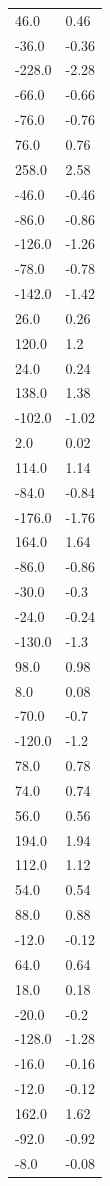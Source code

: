 \begin{longtable}{ll}
46.0 & 0.46 \\
-36.0 & -0.36 \\
-228.0 & -2.28 \\
-66.0 & -0.66 \\
-76.0 & -0.76 \\
76.0 & 0.76 \\
258.0 & 2.58 \\
-46.0 & -0.46 \\
-86.0 & -0.86 \\
-126.0 & -1.26 \\
-78.0 & -0.78 \\
-142.0 & -1.42 \\
26.0 & 0.26 \\
120.0 & 1.2 \\
24.0 & 0.24 \\
138.0 & 1.38 \\
-102.0 & -1.02 \\
2.0 & 0.02 \\
114.0 & 1.14 \\
-84.0 & -0.84 \\
-176.0 & -1.76 \\
164.0 & 1.64 \\
-86.0 & -0.86 \\
-30.0 & -0.3 \\
-24.0 & -0.24 \\
-130.0 & -1.3 \\
98.0 & 0.98 \\
8.0 & 0.08 \\
-70.0 & -0.7 \\
-120.0 & -1.2 \\
78.0 & 0.78 \\
74.0 & 0.74 \\
56.0 & 0.56 \\
194.0 & 1.94 \\
112.0 & 1.12 \\
54.0 & 0.54 \\
88.0 & 0.88 \\
-12.0 & -0.12 \\
64.0 & 0.64 \\
18.0 & 0.18 \\
-20.0 & -0.2 \\
-128.0 & -1.28 \\
-16.0 & -0.16 \\
-12.0 & -0.12 \\
162.0 & 1.62 \\
-92.0 & -0.92 \\
-8.0 & -0.08 \\

\end{longtable}
